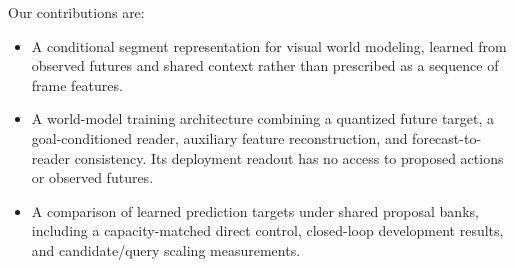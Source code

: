 Our contributions are:
\begin{itemize}[leftmargin=*,topsep=2pt,itemsep=1pt]
\item A conditional segment representation for visual world modeling, learned from observed futures and shared context rather than prescribed as a sequence of frame features.
\item A world-model training architecture combining a quantized future target, a goal-conditioned reader, auxiliary feature reconstruction, and forecast-to-reader consistency. Its deployment readout has no access to proposed actions or observed futures.
\item A comparison of learned prediction targets under shared proposal banks, including a capacity-matched direct control, closed-loop development results, and candidate/query scaling measurements.
\end{itemize}
